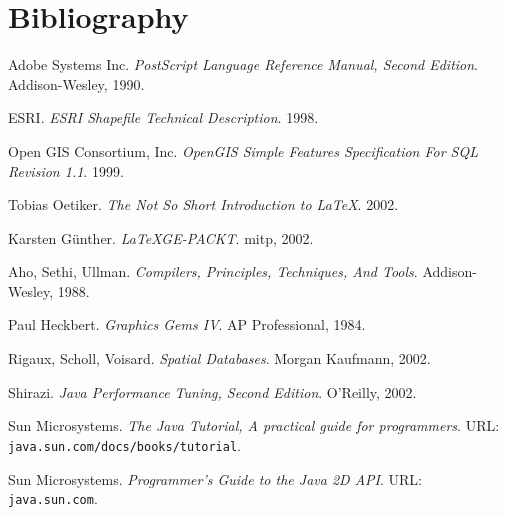 
\section{Bibliography}

\begin{thebibliography}{99}

Adobe Systems Inc. \emph{PostScript Language Reference Manual, Second
Edition}.  Addison-Wesley, 1990.

ESRI. \emph{ESRI Shapefile Technical Description}. 1998.

Open GIS Consortium, Inc. \emph{OpenGIS Simple Features Specification
For SQL Revision 1.1}.  1999.

Tobias Oetiker. \emph{The Not So Short Introduction to
\LaTeX}.  2002.

Karsten G\"unther. \emph{\LaTeX GE-PACKT}. mitp, 2002.

Aho, Sethi, Ullman. \emph{Compilers, Principles, Techniques, And Tools}.
Addison-Wesley, 1988.

Paul Heckbert. \emph{Graphics Gems IV}.
AP Professional, 1984.

Rigaux, Scholl, Voisard. \emph{Spatial Databases}.
Morgan Kaufmann, 2002.

Shirazi. \emph{Java Performance Tuning, Second Edition}.
O'Reilly, 2002.

Sun Microsystems. \emph{The Java Tutorial, A practical guide for programmers}.
URL: \texttt{java.sun.com/docs/books/tutorial}.

Sun Microsystems. \emph{Programmer's Guide to the Java 2D API}.
URL: \texttt{java.sun.com}.

\end{thebibliography}

